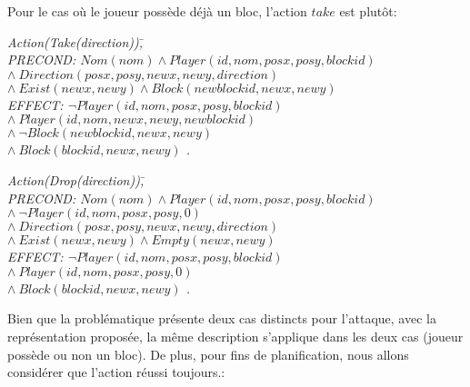 \documentclass[12pt,english,frenchb,letterpaper]{article}
\begin{document}
Pour le cas où le joueur possède déjà un bloc, l'action $take$ est plutôt:
\begin{tabbing}
\it{Action}\=\it{(Take(direction))}\=,\\
\> PRECOND: \> $Nom(nom) \wedge Player(id,nom,posx,posy,blockid)$ \\ 
\> \> $  \wedge \ Direction(posx,posy,newx,newy,direction) $ \\
\> \> $   \wedge \ Exist(newx,newy) \wedge Block(newblockid,newx,newy) $ \\               
\> EFFECT: \>$ \lnot Player(id,nom,posx,posy,blockid) $ \\
\>  \> $\wedge\ Player(id,nom,newx,newy,newblockid)$ \\
\> \> $\wedge\ \lnot Block(newblockid,newx,newy) $ \\
\> \> $\wedge\ Block(blockid,newx,newy) $ .\\
\end{tabbing}

\begin{tabbing}
\it{Action}\=\it{(Drop(direction))}\=,\\
\> PRECOND: \> $Nom(nom) \wedge Player(id,nom,posx,posy,blockid)$ \\ 
\> \> $  \wedge \  \lnot Player(id,nom,posx,posy,0) $ \\
\> \> $  \wedge \ Direction(posx,posy,newx,newy,direction) $ \\
\> \> $   \wedge \ Exist(newx,newy) \wedge Empty(newx,newy) $ \\               
\> EFFECT: \>$ \lnot Player(id,nom,posx,posy,blockid) $ \\
\>  \> $\wedge\ Player(id,nom,posx,posy,0)$ \\
\> \> $\wedge\ Block(blockid,newx,newy) $ .\\
\end{tabbing}

Bien que la problématique présente deux cas distincts pour l'attaque, avec la représentation proposée, la même description s'applique dans les deux cas (joueur possède ou non un bloc).  De plus, pour fins de planification, nous allons considérer que l'action réussi toujours.:
\end{document}
